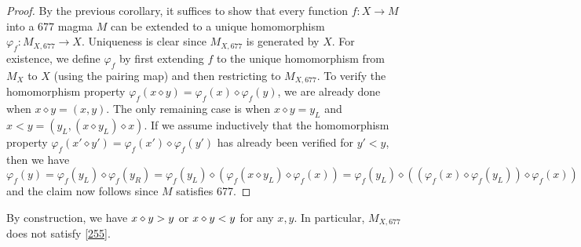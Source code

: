 \begin{proof}  By the previous corollary, it suffices to show that every function $f: X \to M$ into a 677 magma $M$ can be extended to a unique homomorphism $\varphi_f: M_{X,677} \to X$. Uniqueness is clear since $M_{X,677}$ is generated by $X$.  For existence, we define $\varphi_f$ by first extending $f$ to the unique homomorphism from $M_X$ to $X$ (using the pairing map) and then restricting to $M_{X,677}$.  To verify the homomorphism property $\varphi_f(x \diamond y) = \varphi_f(x) \diamond \varphi_f(y)$, we are already done when $x \diamond y = (x,y)$. The only remaining case is when $x \diamond y = y_L$ and $x < y = (y_L,  (x \diamond y_L) \diamond x)$.   If we assume inductively that the homomorphism property $\varphi_f(x' \diamond y') = \varphi_f(x') \diamond \varphi_f(y')$ has already been verified for $y' < y$, then we have
  $$ \varphi_f(y) = \varphi_f(y_L) \diamond \varphi_f(y_R) = \varphi_f(y_L) \diamond (\varphi_f(x \diamond y_L) \diamond \varphi_f(x)) =  \varphi_f(y_L) \diamond ((\varphi_f(x) \diamond \varphi_f(y_L)) \diamond \varphi_f(x))$$
  and the claim now follows since $M$ satisfies 677.
\end{proof}

By construction, we have $x \diamond y > y$ or $x \diamond y < y$ for any $x,y$.  In particular, $M_{X,677}$ does not satisfy \eqref{255}.
